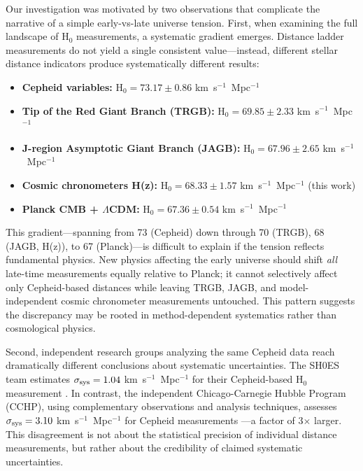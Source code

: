 \documentclass[twocolumn, linenumbers]{aastex701}
\begin{document}
Our investigation was motivated by two observations that complicate the narrative of a simple early-vs-late universe tension. First, when examining the full landscape of H$_0$ measurements, a systematic gradient emerges. Distance ladder measurements do not yield a single consistent value---instead, different stellar distance indicators produce systematically different results:

\begin{itemize}
\item \textbf{Cepheid variables:} H$_0 = 73.17 \pm 0.86$ km~s$^{-1}$~Mpc$^{-1}$ \citep{Riess2022}
\item \textbf{Tip of the Red Giant Branch (TRGB):} H$_0 = 69.85 \pm 2.33$ km~s$^{-1}$~Mpc$^{-1}$ \citep{Freedman2024}
\item \textbf{J-region Asymptotic Giant Branch (JAGB):} H$_0 = 67.96 \pm 2.65$ km~s$^{-1}$~Mpc$^{-1}$ \citep{Freedman2024}
\item \textbf{Cosmic chronometers H(z):} H$_0 = 68.33 \pm 1.57$ km~s$^{-1}$~Mpc$^{-1}$ (this work)
\item \textbf{Planck CMB + $\Lambda$CDM:} H$_0 = 67.36 \pm 0.54$ km~s$^{-1}$~Mpc$^{-1}$ \citep{Planck2018}
\end{itemize}

This gradient---spanning from 73 (Cepheid) down through 70 (TRGB), 68 (JAGB, H(z)), to 67 (Planck)---is difficult to explain if the tension reflects fundamental physics. New physics affecting the early universe should shift \textit{all} late-time measurements equally relative to Planck; it cannot selectively affect only Cepheid-based distances while leaving TRGB, JAGB, and model-independent cosmic chronometer measurements untouched. This pattern suggests the discrepancy may be rooted in method-dependent systematics rather than cosmological physics.

Second, independent research groups analyzing the same Cepheid data reach dramatically different conclusions about systematic uncertainties. The SH0ES team estimates $\sigma_{\rm sys} = 1.04$ km~s$^{-1}$~Mpc$^{-1}$ for their Cepheid-based H$_0$ measurement \citep{Riess2022}. In contrast, the independent Chicago-Carnegie Hubble Program (CCHP), using complementary observations and analysis techniques, assesses $\sigma_{\rm sys} = 3.10$ km~s$^{-1}$~Mpc$^{-1}$ for Cepheid measurements \citep{Freedman2024}---a factor of 3$\times$ larger. This disagreement is not about the statistical precision of individual distance measurements, but rather about the credibility of claimed systematic uncertainties.
\end{document}
